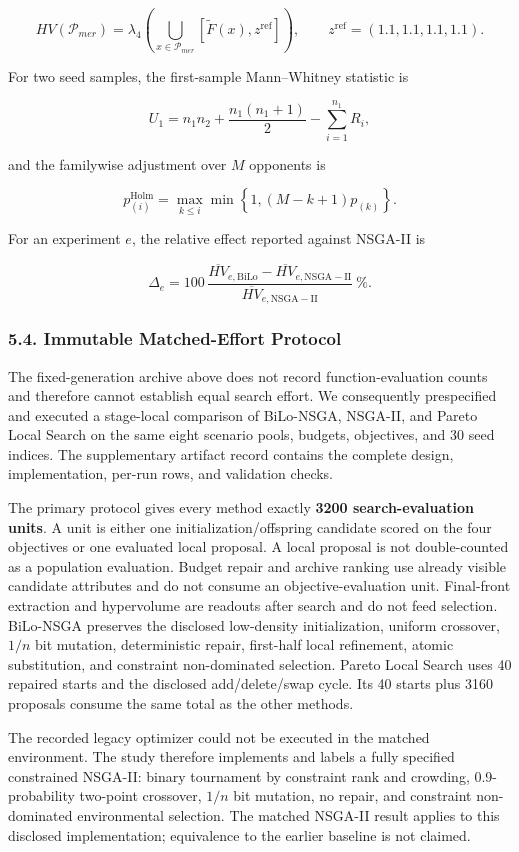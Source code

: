 \documentclass[
]{article}
\begin{document}
\[
HV(\mathcal{P}_{mer})=\lambda_4\!\left(\bigcup_{x\in\mathcal{P}_{mer}}[\tilde F(x),z^{\mathrm{ref}}]\right),\qquad z^{\mathrm{ref}}=(1.1,1.1,1.1,1.1).
\]

For two seed samples, the first-sample Mann--Whitney statistic is

\[
U_1=n_1n_2+\frac{n_1(n_1+1)}{2}-\sum_{i=1}^{n_1}R_i,
\]

and the familywise adjustment over \(M\) opponents is

\[
p^{\mathrm{Holm}}_{(i)}=\max_{k\leq i}\min\!\left\{1,(M-k+1)p_{(k)}\right\}.
\]

For an experiment \(e\), the relative effect reported against NSGA-II is

\[
\Delta_e=100\,\frac{\overline{HV}_{e,\mathrm{BiLo}}-\overline{HV}_{e,\mathrm{NSGA-II}}}{\overline{HV}_{e,\mathrm{NSGA-II}}}\ \%.
\]

\subsubsection{5.4. Immutable Matched-Effort Protocol}\label{immutable-matched-effort-protocol}

The fixed-generation archive above does not record function-evaluation counts and therefore cannot establish equal search effort. We consequently prespecified and executed a stage-local comparison of BiLo-NSGA, NSGA-II, and Pareto Local Search on the same eight scenario pools, budgets, objectives, and 30 seed indices. The supplementary artifact record contains the complete design, implementation, per-run rows, and validation checks.

The primary protocol gives every method exactly \textbf{3200 search-evaluation units}. A unit is either one initialization/offspring candidate scored on the four objectives or one evaluated local proposal. A local proposal is not double-counted as a population evaluation. Budget repair and archive ranking use already visible candidate attributes and do not consume an objective-evaluation unit. Final-front extraction and hypervolume are readouts after search and do not feed selection. BiLo-NSGA preserves the disclosed low-density initialization, uniform crossover, \(1/n\) bit mutation, deterministic repair, first-half local refinement, atomic substitution, and constraint non-dominated selection. Pareto Local Search uses 40 repaired starts and the disclosed add/delete/swap cycle. Its 40 starts plus 3160 proposals consume the same total as the other methods.

The recorded legacy optimizer could not be executed in the matched environment. The study therefore implements and labels a fully specified constrained NSGA-II: binary tournament by constraint rank and crowding, 0.9-probability two-point crossover, \(1/n\) bit mutation, no repair, and constraint non-dominated environmental selection. The matched NSGA-II result applies to this disclosed implementation; equivalence to the earlier baseline is not claimed.
\end{document}

